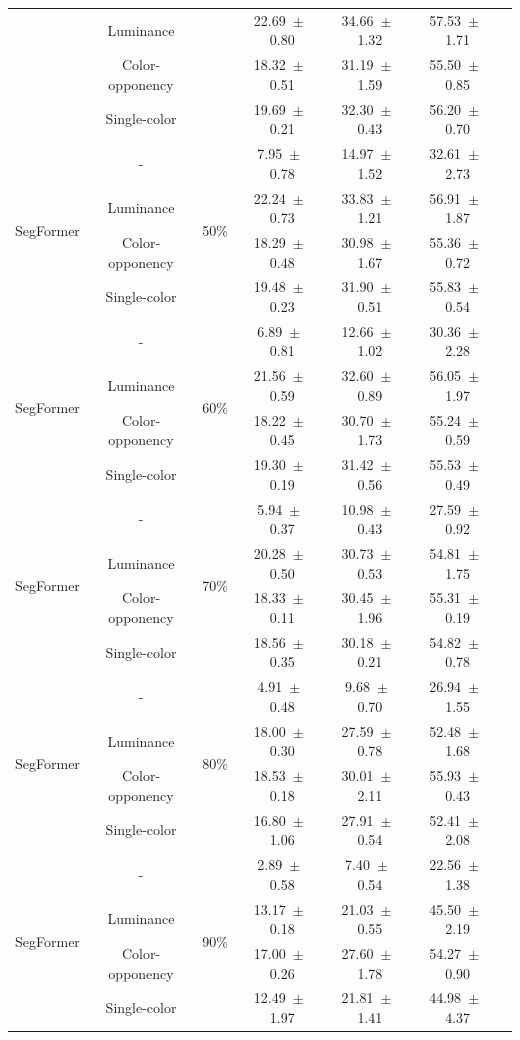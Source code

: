 \begin{table}[h]
\begin{tabular}{@{}lccc ccc@{}}
& Luminance & & 22.69~$\pm$~0.80 & 34.66~$\pm$~1.32 & 57.53~$\pm$~1.71 \\
& Color-opponency & & 18.32~$\pm$~0.51 & 31.19~$\pm$~1.59 & 55.50~$\pm$~0.85 \\
& Single-color & & 19.69~$\pm$~0.21 & 32.30~$\pm$~0.43 & 56.20~$\pm$~0.70 \\
\midrule
\multirow{4}{*}{SegFormer} & - & \multirow{4}{*}{50\%} & 7.95~$\pm$~0.78 & 14.97~$\pm$~1.52 & 32.61~$\pm$~2.73 \\
& Luminance & & 22.24~$\pm$~0.73 & 33.83~$\pm$~1.21 & 56.91~$\pm$~1.87 \\
& Color-opponency & & 18.29~$\pm$~0.48 & 30.98~$\pm$~1.67 & 55.36~$\pm$~0.72 \\
& Single-color & & 19.48~$\pm$~0.23 & 31.90~$\pm$~0.51 & 55.83~$\pm$~0.54 \\
\midrule
\multirow{4}{*}{SegFormer} & - & \multirow{4}{*}{60\%} & 6.89~$\pm$~0.81 & 12.66~$\pm$~1.02 & 30.36~$\pm$~2.28 \\
& Luminance & & 21.56~$\pm$~0.59 & 32.60~$\pm$~0.89 & 56.05~$\pm$~1.97 \\
& Color-opponency & & 18.22~$\pm$~0.45 & 30.70~$\pm$~1.73 & 55.24~$\pm$~0.59 \\
& Single-color & & 19.30~$\pm$~0.19 & 31.42~$\pm$~0.56 & 55.53~$\pm$~0.49 \\
\midrule
\multirow{4}{*}{SegFormer} & - & \multirow{4}{*}{70\%} & 5.94~$\pm$~0.37 & 10.98~$\pm$~0.43 & 27.59~$\pm$~0.92 \\
& Luminance & & 20.28~$\pm$~0.50 & 30.73~$\pm$~0.53 & 54.81~$\pm$~1.75 \\
& Color-opponency & & 18.33~$\pm$~0.11 & 30.45~$\pm$~1.96 & 55.31~$\pm$~0.19 \\
& Single-color & & 18.56~$\pm$~0.35 & 30.18~$\pm$~0.21 & 54.82~$\pm$~0.78 \\
\midrule
\multirow{4}{*}{SegFormer} & - & \multirow{4}{*}{80\%} & 4.91~$\pm$~0.48 & 9.68~$\pm$~0.70 & 26.94~$\pm$~1.55 \\
& Luminance & & 18.00~$\pm$~0.30 & 27.59~$\pm$~0.78 & 52.48~$\pm$~1.68 \\
& Color-opponency & & 18.53~$\pm$~0.18 & 30.01~$\pm$~2.11 & 55.93~$\pm$~0.43 \\
& Single-color & & 16.80~$\pm$~1.06 & 27.91~$\pm$~0.54 & 52.41~$\pm$~2.08 \\
\midrule
\multirow{4}{*}{SegFormer} & - & \multirow{4}{*}{90\%} & 2.89~$\pm$~0.58 & 7.40~$\pm$~0.54 & 22.56~$\pm$~1.38 \\
& Luminance & & 13.17~$\pm$~0.18 & 21.03~$\pm$~0.55 & 45.50~$\pm$~2.19 \\
& Color-opponency & & 17.00~$\pm$~0.26 & 27.60~$\pm$~1.78 & 54.27~$\pm$~0.90 \\
& Single-color & & 12.49~$\pm$~1.97 & 21.81~$\pm$~1.41 & 44.98~$\pm$~4.37 \\
\midrule
\bottomrule
\end{tabular}
\label{tab:sparse_results_segformer_acdc_night}
\end{table}